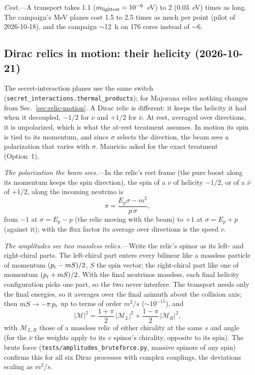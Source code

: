 \documentclass[11pt,a4paper]{article}
\newcommand{\file}[1]{\nolinkurl{#1}}
\begin{document}
\textit{Cost.}---A transport takes 1.1 ($m_{\rm lightest} = 10^{-6}$~eV) to 2 ($0.03$~eV) times as
long. The campaign's MeV planes cost 1.5 to 2.5 times as much per point (pilot of 2026-10-18), and
the campaign $\sim$12~h on 176 cores instead of $\sim$6.

\subsection{Dirac relics in motion: their helicity (2026-10-21)}
\label{sec:dirac-helicity}

The secret-interaction planes use the same switch (\texttt{secret\_interactions.thermal\_products});
for Majorana relics nothing changes from Sec.~\ref{sec:relic-motion}. A Dirac relic is different: it
keeps the helicity it had when it decoupled, $-1/2$ for $\nu$ and $+1/2$ for $\bar\nu$. At rest,
averaged over directions, it is unpolarized, which is what the at-rest treatment assumes. In motion
its spin is tied to its momentum, and since $\sigma$ selects the direction, the beam sees a
polarization that varies with $\sigma$. Mauricio asked for the exact treatment (Option~1).

\textit{The polarization the beam sees.}---In the relic's rest frame (the pure boost along its
momentum keeps the spin direction), the spin of a $\nu$ of helicity $-1/2$, or of a $\bar\nu$ of
$+1/2$, along the incoming neutrino is
\begin{equation}
\pi = \frac{E_p\sigma - m^2}{p\,\sigma},
\end{equation}
from $-1$ at $\sigma = E_p - p$ (the relic moving with the beam) to $+1$ at $\sigma = E_p + p$
(against it); with the flux factor its average over directions is the speed $v$.

\textit{The amplitudes see two massless relics.}---Write the relic's spinor as its left- and
right-chiral parts. The left-chiral part enters every bilinear like a massless particle of
momentum $(p_{\rm r} - mS)/2$, $S$ the spin vector; the right-chiral part like one of momentum
$(p_{\rm r} + mS)/2$. With the final neutrinos massless, each final helicity configuration picks
one part, so the two never interfere. The transport needs only the final energies, so it averages
over the final azimuth about the collision axis; then $mS \to -\pi\, p_{\rm r}$ up to terms of
order $m^2/s$ ($\sim\!10^{-15}$), and
\begin{equation}
|\mathcal M|^2 = \frac{1+\pi}{2}\,|\mathcal M_L|^2 + \frac{1-\pi}{2}\,|\mathcal M_R|^2 ,
\end{equation}
with $\mathcal M_{L,R}$ those of a massless relic of either chirality at the same $s$ and angle
(for the $\bar\nu$ the weights apply to its $v$ spinor's chirality, opposite to its spin). The
brute force (\file{tests/amplitudes\_bruteforce.py}, massive spinors of any spin) confirms this for
all six Dirac processes with complex couplings, the deviations scaling as $m^2/s$.
\end{document}
